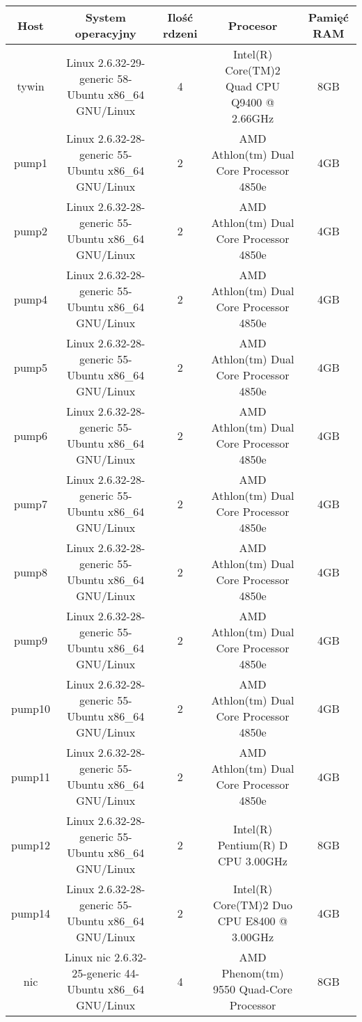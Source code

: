 \documentclass[a4paper,titlepage,12pt]{article}
\begin{document}
\begin{footnotesize}
\begin{sidewaystable}[h] 
  \begin{center}
      \caption{Parametry symulowanych konfiguracji mikroprocesora}
      \label{tab:hosts}
          \begin{tabular}{|c|c|c|c|c|}
              \hline
              Host & System operacyjny & Ilość rdzeni & Procesor & Pamięć RAM\\ 
              \hline
                tywin & Linux 2.6.32-29-generic 58-Ubuntu x86\_64 GNU/Linux & 4 & Intel(R) Core(TM)2 Quad CPU    Q9400  @ 2.66GHz & 8GB\\ 
                pump1 & Linux 2.6.32-28-generic 55-Ubuntu x86\_64 GNU/Linux & 2 & AMD Athlon(tm) Dual Core Processor 4850e & 4GB\\ 
                pump2 & Linux 2.6.32-28-generic 55-Ubuntu x86\_64 GNU/Linux & 2 & AMD Athlon(tm) Dual Core Processor 4850e & 4GB\\ 
                pump4 & Linux 2.6.32-28-generic 55-Ubuntu x86\_64 GNU/Linux & 2 & AMD Athlon(tm) Dual Core Processor 4850e & 4GB\\ 
                pump5 & Linux 2.6.32-28-generic 55-Ubuntu x86\_64 GNU/Linux & 2 & AMD Athlon(tm) Dual Core Processor 4850e & 4GB\\ 
                pump6 & Linux 2.6.32-28-generic 55-Ubuntu x86\_64 GNU/Linux & 2 & AMD Athlon(tm) Dual Core Processor 4850e & 4GB\\ 
                pump7 & Linux 2.6.32-28-generic 55-Ubuntu x86\_64 GNU/Linux & 2 & AMD Athlon(tm) Dual Core Processor 4850e & 4GB\\ 
                pump8 & Linux 2.6.32-28-generic 55-Ubuntu x86\_64 GNU/Linux & 2 & AMD Athlon(tm) Dual Core Processor 4850e & 4GB\\ 
                pump9 & Linux 2.6.32-28-generic 55-Ubuntu x86\_64 GNU/Linux & 2 & AMD Athlon(tm) Dual Core Processor 4850e & 4GB\\ 
                pump10 & Linux 2.6.32-28-generic 55-Ubuntu x86\_64 GNU/Linux & 2 & AMD Athlon(tm) Dual Core Processor 4850e & 4GB\\ 
                pump11 & Linux 2.6.32-28-generic 55-Ubuntu x86\_64 GNU/Linux & 2 & AMD Athlon(tm) Dual Core Processor 4850e & 4GB\\ 
                pump12 & Linux 2.6.32-28-generic 55-Ubuntu x86\_64 GNU/Linux & 2 & Intel(R) Pentium(R) D CPU 3.00GHz & 8GB\\ 
                pump14 & Linux 2.6.32-28-generic 55-Ubuntu x86\_64 GNU/Linux & 2 & Intel(R) Core(TM)2 Duo CPU     E8400  @ 3.00GHz & 4GB\\ 
                \hline
                nic & Linux nic 2.6.32-25-generic 44-Ubuntu x86\_64 GNU/Linux & 4 & AMD Phenom(tm) 9550 Quad-Core Processor & 8GB
              \hline
          \end{tabular}
  \end{center}
\end{sidewaystable}
\end{footnotesize}
\end{document}
